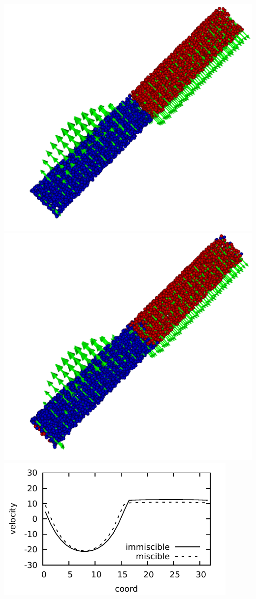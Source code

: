 \includegraphics[width=\textwidth]{i/flow/a/visit.png}
\includegraphics[width=\textwidth]{i/flow/b/visit.png}
\includegraphics[width=\textwidth]{i/flow/prof.pdf}

